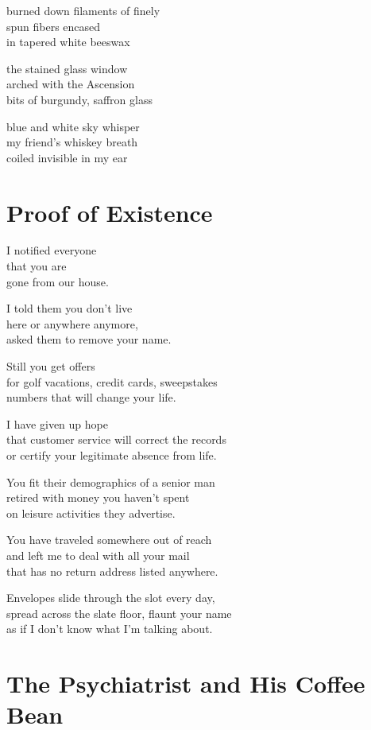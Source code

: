 \documentclass[twoside,10pt]{book}
\begin{document}
burned down filaments of finely\\
spun fibers encased\\
in tapered white beeswax

the stained glass window\\
arched with the Ascension\\
bits of burgundy, saffron glass

blue and white sky whisper\\
my friend's whiskey breath\\
coiled invisible in my ear


\clearpage
\section{Proof of Existence}

I notified everyone\\
that you are\\
gone from our house.

I told them you don't live\\
here or anywhere anymore,\\
asked them to remove your name.

Still you get offers\\
for golf vacations, credit cards, sweepstakes\\
numbers that will change your life.

I have given up hope\\
that customer service will correct the records\\
or certify your legitimate absence from life.

You fit their demographics of a senior man\\
retired with money you haven't spent\\
on leisure activities they advertise.

You have traveled somewhere out of reach\\
and left me to deal with all your mail\\
that has no return address listed anywhere.

Envelopes slide through the slot every day,\\
spread across the slate floor, flaunt your name\\
as if I don't know what I'm talking about.


\clearpage
\section{The Psychiatrist and His Coffee Bean}
\end{document}
